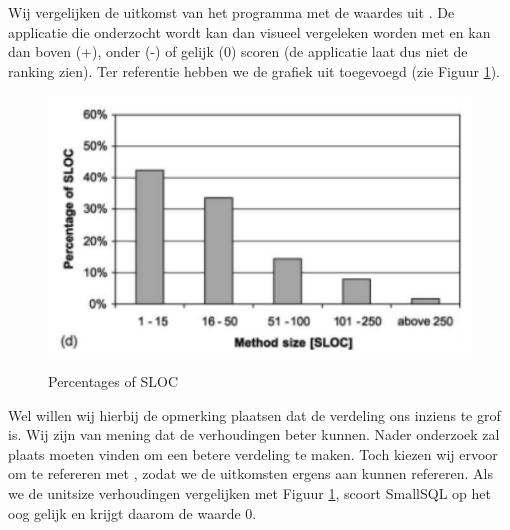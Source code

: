 \documentclass[a4paper]{article}
\begin{document}
Wij vergelijken de uitkomst van het programma met de waardes uit \cite{B}. De applicatie die onderzocht wordt kan dan visueel vergeleken worden met \cite{B} en kan dan boven (+), onder (-) of gelijk (0) scoren (de applicatie laat dus niet de ranking zien). Ter referentie hebben we de grafiek uit \cite{B} toegevoegd (zie Figuur \ref{fig:RefVerdeling}).
\begin{figure}[htbp]
\caption{Percentages of SLOC}
\centering
\includegraphics[width=0.6 \textwidth]{Capture.png}
\label{fig:RefVerdeling}
\end{figure}

Wel willen wij hierbij de opmerking plaatsen dat de verdeling ons inziens te grof is. Wij zijn van mening dat de verhoudingen beter kunnen. Nader onderzoek zal plaats moeten vinden om een betere verdeling te maken. Toch kiezen wij ervoor om te refereren met \cite{B}, zodat we de uitkomsten ergens aan kunnen refereren. Als we de unitsize verhoudingen vergelijken met Figuur \ref{fig:RefVerdeling}, scoort SmallSQL op het oog gelijk en krijgt daarom de waarde 0.
\end{document}
